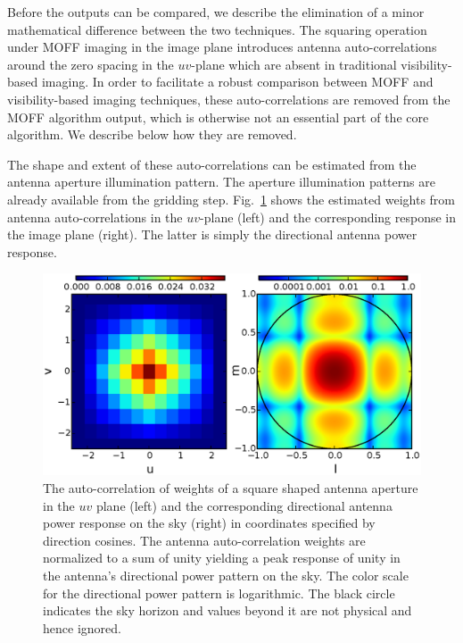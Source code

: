 \documentclass[a4paper,fleqn,usenatbib]{mnras}
\begin{document}
Before the outputs can be compared, we describe the elimination of a minor 
mathematical difference between the two techniques. The squaring operation under 
MOFF imaging in the image plane introduces antenna auto-correlations around the 
zero spacing in the $uv$-plane which are absent in traditional visibility-based 
imaging. In order to facilitate a robust comparison between MOFF and 
visibility-based imaging techniques, these auto-correlations are removed from 
the MOFF algorithm output, which is otherwise not an essential part of the core 
algorithm. We describe below how they are removed. 

The shape and extent of these auto-correlations can be estimated from the 
antenna aperture illumination pattern. The aperture illumination patterns
are already available from the gridding step. Fig.~\ref{fig:autocorr_wts_PB} 
shows the estimated weights from antenna auto-correlations in the $uv$-plane 
(left) and the corresponding response in the image plane (right). The latter 
is simply the directional antenna power response. 

\begin{figure}
  \includegraphics[width=\columnwidth]{figure4}
  \caption{The auto-correlation of weights of a square shaped antenna aperture
    in the $uv$ plane (left) and the corresponding directional antenna power 
    response on the sky (right) in coordinates specified by direction cosines. 
    The antenna auto-correlation weights are normalized to a sum
    of unity yielding a peak response of unity in the antenna's directional
    power pattern on the sky. The color scale for the directional power 
    pattern is logarithmic. The black circle indicates the sky horizon and
    values beyond it are not physical and hence ignored.}
  \label{fig:autocorr_wts_PB}
\end{figure}
\end{document}
